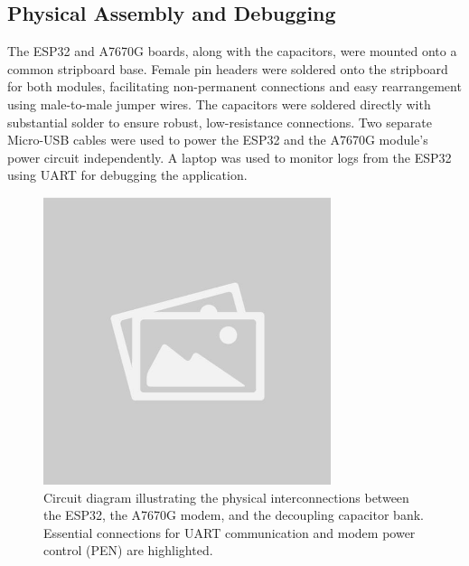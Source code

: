 \subsection{Physical Assembly and Debugging}
\label{ssec:assembly}
The ESP32 and A7670G boards, along with the capacitors, were mounted onto a common stripboard base. Female pin headers were soldered onto the stripboard for both modules, facilitating non-permanent connections and easy rearrangement using male-to-male jumper wires. The capacitors were soldered directly with substantial solder to ensure robust, low-resistance connections. Two separate Micro-USB cables were used to power the ESP32 and the A7670G module's power circuit independently. A laptop was used to monitor logs from the ESP32 using UART for debugging the application.

\begin{figure}[H]
    \centering
    \includegraphics[width=0.75\textwidth]{placeholder.jpg}
    \caption{Circuit diagram illustrating the physical interconnections between the ESP32, the A7670G modem, and the decoupling capacitor bank. Essential connections for UART communication and modem power control (PEN) are highlighted.}
    \label{fig:hardware-schematic}
\end{figure}

